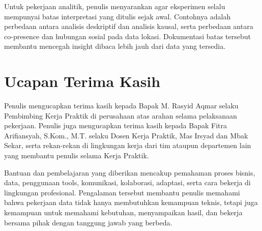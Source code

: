 Untuk pekerjaan analitik, penulis menyarankan agar eksperimen selalu mempunyai batas interpretasi yang ditulis sejak awal. Contohnya adalah perbedaan antara analisis deskriptif dan analisis kausal, serta perbedaan antara co-presence dan hubungan sosial pada data lokasi. Dokumentasi batas tersebut membantu mencegah insight dibaca lebih jauh dari data yang tersedia.

\section{Ucapan Terima Kasih}
Penulis mengucapkan terima kasih kepada Bapak M. Rasyid Aqmar selaku Pembimbing Kerja Praktik di perusahaan atas arahan selama pelaksanaan pekerjaan. Penulis juga mengucapkan terima kasih kepada Bapak Fitra Arifiansyah, S.Kom., M.T. selaku Dosen Kerja Praktik, Mas Irsyad dan Mbak Sekar, serta rekan-rekan di lingkungan kerja dari tim ataupun departemen lain yang membantu penulis selama Kerja Praktik.

Bantuan dan pembelajaran yang diberikan mencakup pemahaman proses bisnis, data, penggunaan tools, komunikasi, kolaborasi, adaptasi, serta cara bekerja di lingkungan profesional. Pengalaman tersebut membantu penulis memahami bahwa pekerjaan data tidak hanya membutuhkan kemampuan teknis, tetapi juga kemampuan untuk memahami kebutuhan, menyampaikan hasil, dan bekerja bersama pihak dengan tanggung jawab yang berbeda.
